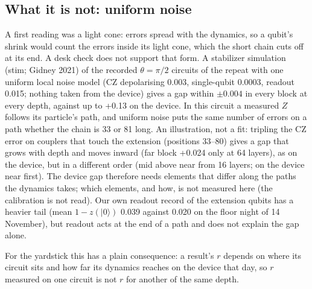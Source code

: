 \documentclass[10pt,a4paper]{article}
\begin{document}
\subsection{What it is not: uniform noise}
A first reading was a light cone: errors spread with the dynamics, so a qubit's shrink would count the errors inside
its light cone, which the short chain cuts off at its end. A desk check does not support that form. A stabilizer
simulation (stim; Gidney 2021) of the recorded $\theta = \pi/2$ circuits of the repeat with one uniform local noise model (CZ
depolarising 0.003, single-qubit 0.0003, readout 0.015; nothing taken from the device) gives a gap within $\pm0.004$ in
every block at every depth, against up to +0.13 on the device. In this circuit a measured $Z$ follows its particle's
path, and uniform noise puts the same number of errors on a path whether the chain is 33 or 81 long. An illustration,
not a fit: tripling the CZ error on couplers that touch the extension (positions 33--80) gives a gap that grows with
depth and moves inward (far block +0.024 only at 64 layers), as on the device, but in a different order (mid above near
from 16 layers; on the device near first). The device gap therefore needs elements that differ along the paths the
dynamics takes; which elements, and how, is not measured here (the calibration is not read). Our own readout record of
the extension qubits has a heavier tail (mean $1 - z(|0\rangle)$ 0.039 against 0.020 on the floor night of 14 November), but readout acts at the end of a
path and does not explain the gap alone.

For the yardstick this has a plain consequence: a result's $r$ depends on where its circuit sits and how far its
dynamics reaches on the device that day, so $r$ measured on one circuit is not $r$ for another of the same depth.
\end{document}
